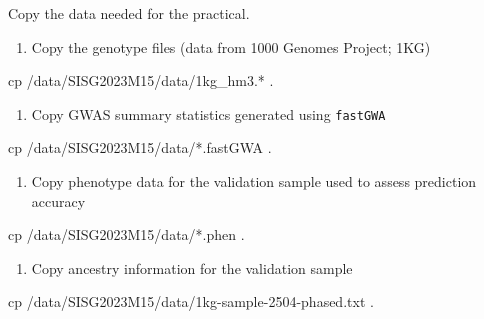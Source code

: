 \documentclass[
  letterpaper,
  DIV=11,
  numbers=noendperiod]{scrartcl}
\newenvironment{Shaded}{\begin{snugshade}}{\end{snugshade}}
\newcommand{\FunctionTok}[1]{\textcolor[rgb]{0.28,0.35,0.67}{#1}}
\newcommand{\NormalTok}[1]{\textcolor[rgb]{0.00,0.23,0.31}{#1}}
\newcommand{\PreprocessorTok}[1]{\textcolor[rgb]{0.68,0.00,0.00}{#1}}
\providecommand{\tightlist}{%
  \setlength{\itemsep}{0pt}\setlength{\parskip}{0pt}}
\begin{document}
Copy the data needed for the practical.

\begin{enumerate}
\def\labelenumi{\arabic{enumi})}
\tightlist
\item
  Copy the genotype files (data from 1000 Genomes Project; 1KG)
\end{enumerate}

\begin{Shaded}
\begin{Highlighting}[]
\FunctionTok{cp}\NormalTok{ /data/SISG2023M15/data/1kg\_hm3.}\PreprocessorTok{*}\NormalTok{ .}
\end{Highlighting}
\end{Shaded}

\begin{enumerate}
\def\labelenumi{\arabic{enumi})}
\setcounter{enumi}{1}
\tightlist
\item
  Copy GWAS summary statistics generated using \texttt{fastGWA}
\end{enumerate}

\begin{Shaded}
\begin{Highlighting}[]
\FunctionTok{cp}\NormalTok{ /data/SISG2023M15/data/}\PreprocessorTok{*}\NormalTok{.fastGWA .}
\end{Highlighting}
\end{Shaded}

\begin{enumerate}
\def\labelenumi{\arabic{enumi})}
\setcounter{enumi}{2}
\tightlist
\item
  Copy phenotype data for the validation sample used to assess
  prediction accuracy
\end{enumerate}

\begin{Shaded}
\begin{Highlighting}[]
\FunctionTok{cp}\NormalTok{ /data/SISG2023M15/data/}\PreprocessorTok{*}\NormalTok{.phen .}
\end{Highlighting}
\end{Shaded}

\begin{enumerate}
\def\labelenumi{\arabic{enumi})}
\setcounter{enumi}{3}
\tightlist
\item
  Copy ancestry information for the validation sample
\end{enumerate}

\begin{Shaded}
\begin{Highlighting}[]
\FunctionTok{cp}\NormalTok{ /data/SISG2023M15/data/1kg{-}sample{-}2504{-}phased.txt .}
\end{Highlighting}
\end{Shaded}
\end{document}
